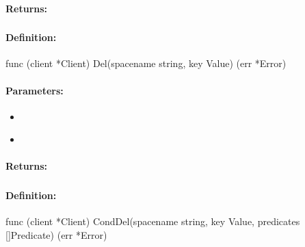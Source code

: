 \paragraph{Returns:}


\pagebreak
\subsubsection{}
\label{api:Go:Del}


\paragraph{Definition:}
\begin{gocode}
func (client *Client) Del(spacename string, key Value) (err *Error)
\end{gocode}

\paragraph{Parameters:}
\begin{itemize}[noitemsep]
\item {}\\

\item {}\\

\end{itemize}

\paragraph{Returns:}


\pagebreak
\subsubsection{}
\label{api:Go:CondDel}


\paragraph{Definition:}
\begin{gocode}
func (client *Client) CondDel(spacename string, key Value, predicates []Predicate) (err *Error)
\end{gocode}

